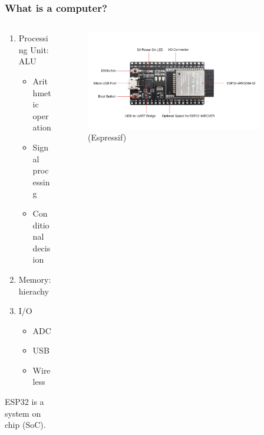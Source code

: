 \documentclass[compress, aspectratio=32]{beamer}
\begin{document}
\begin{frame}
    \frametitle{What is a computer?}
    \begin{columns}
        \begin{column}{0.4\textwidth}
            \begin{enumerate}
                \item Processing Unit: ALU
                    \begin{itemize}
                        \item Arithmetic operation
                        \item Signal processing
                        \item Conditional decision
                    \end{itemize}
                \item Memory: hierachy
                \item I/O
                \begin{itemize}
                    \item ADC
                    \item USB
                    \item Wireless
                \end{itemize}
            \end{enumerate}
            ESP32 is a system on chip (SoC).
        \end{column}
        \begin{column}{0.6\textwidth}
            \begin{figure}
                \includegraphics[width=0.9\textwidth]{esp32-devkitc-functional-overview.jpg}
                \caption*{(Espressif)}
            \end{figure}
        \end{column}
    \end{columns}
\end{frame}
\end{document}
